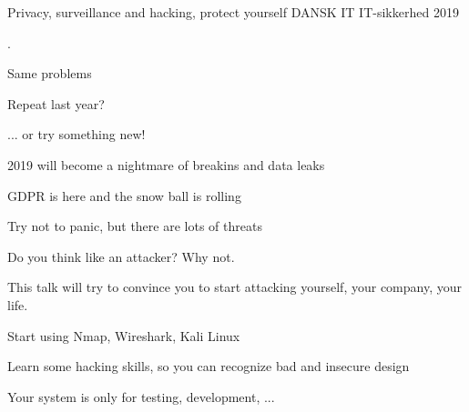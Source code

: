 \documentclass[Screen16to9,17pt,footrule]{foils}
\begin{document}




\mytitlepage
{Privacy, surveillance and hacking, protect yourself}
{DANSK IT IT-sikkerhed 2019}


.

\begin{list2}
\item Same problems
\item Repeat last year?
\item ... or try something new!
\item 2019 will become a nightmare of breakins and data leaks
\item GDPR is here and the snow ball is rolling
\end{list2}

\centerline{Try not to panic, but there are lots of threats}


\vskip 2cm

\begin{center}

\bf\Large

Do you think like an attacker?
\vskip 5mm
Why not.
\end{center}

\begin{list2}
\item This talk will try to convince you to start attacking yourself, your company, your life.
\item Start using Nmap, Wireshark, Kali Linux
\item Learn some hacking skills, so you can recognize bad and insecure design
\end{list2}





Your system is only for testing, development, ...
\end{document}
